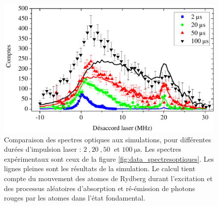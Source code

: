 \begin{figure}[!h]
\centering
\includegraphics[width=\linewidth]{figures/low_l/fitsim_spectresoptiques_fin}
\caption[Comparaison des spectres optiques aux simulations avec équations de taux]{
Comparaison des spectres optiques aux simulations, pour différentes durées d'impulsion laser : $\SI{2}{},\SI{20}{},\SI{50}{}$ et $\SI{100}{\us}$.
Les spectres expérimentaux sont ceux de la figure \ref{fig:data_spectresoptiques}.
Les lignes pleines sont les résultats de la simulation.
Le calcul tient compte du mouvement des atomes de Rydberg durant l'excitation et des processus aléatoires d'absorption et ré-émission de photons rouges par les atomes dans l'état fondamental.
}
\label{fig:fitsim_spectresoptiques_fin}
\end{figure}

